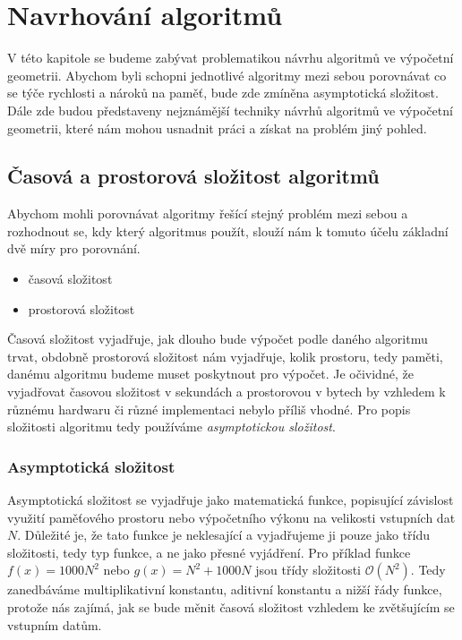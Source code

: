 \chapter{Navrhování algoritmů}
\label{chap:navrhovanialgoritmu}
V této kapitole se budeme zabývat problematikou návrhu algoritmů ve
výpočetní geometrii. Abychom byli schopni jednotlivé algoritmy mezi
sebou porovnávat co se týče rychlosti a nároků na paměť, bude zde
zmíněna asymptotická složitost. Dále zde budou představeny nejznámější
techniky návrhů algoritmů ve výpočetní geometrii, které nám mohou
usnadnit práci a získat na problém jiný pohled.

\section{Časová a prostorová složitost algoritmů}
Abychom mohli porovnávat algoritmy řešící stejný problém mezi sebou a
rozhodnout se, kdy který algoritmus použít, slouží nám k tomuto účelu
základní dvě míry pro porovnání.
\begin{itemize}
	\item časová složitost
	\item prostorová složitost
\end{itemize}
Časová složitost vyjadřuje, jak dlouho bude výpočet podle daného
algoritmu trvat, obdobně prostorová složitost nám vyjadřuje, kolik
prostoru, tedy paměti, danému algoritmu budeme muset poskytnout pro
výpočet. Je očividné, že vyjadřovat časovou složitost v sekundách a
prostorovou v bytech by vzhledem k různému hardwaru či různé
implementaci nebylo příliš vhodné. Pro popis složitosti algoritmu tedy
používáme \textit{asymptotickou složitost}.
	
\subsection{Asymptotická složitost}
Asymptotická složitost se vyjadřuje jako matematická funkce,
popisující závislost využití paměťového prostoru nebo výpočetního
výkonu na velikosti vstupních dat $N$. Důležité je, že tato funkce je
neklesající a vyjadřujeme ji pouze jako třídu složitosti, tedy typ
funkce, a ne jako přesné vyjádření. Pro příklad funkce $f(x)=1000N^2$
nebo $g(x)=N^2 + 1000N$ jsou třídy složitosti $\mathcal{O}
(N^2)$. Tedy zanedbáváme multiplikativní konstantu, aditivní konstantu
a nižší řády funkce, protože nás zajímá, jak se bude měnit časová
složitost vzhledem ke zvětšujícím se vstupním datům.
	
